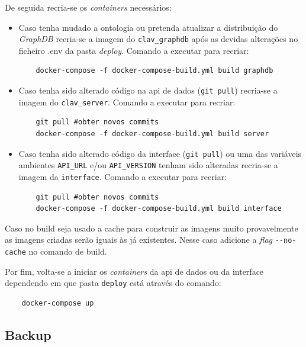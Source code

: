 De seguida recria-se os \textit{containers} necessários:
\begin{itemize}
    \item Caso tenha mudado a ontologia ou pretenda atualizar a distribuição do \textit{GraphDB} recria-se a imagem do \texttt{clav\_graphdb} após as devidas alterações no ficheiro .env da pasta \textit{deploy}. Comando a executar para recriar:
    \begin{verbatim}
    docker-compose -f docker-compose-build.yml build graphdb
    \end{verbatim}
    \item Caso tenha sido alterado código na \acrshort{api} de dados (\verb|git pull|) recria-se a imagem do \texttt{clav\_server}. Comando a executar para recriar:
    \begin{verbatim}
    git pull #obter novos commits
    docker-compose -f docker-compose-build.yml build server
    \end{verbatim}
    \item Caso tenha sido alterado código da interface (\verb|git pull|) ou uma das variáveis ambientes \texttt{API\_URL} e/ou \texttt{API\_VERSION} tenham sido alteradas recria-se a imagem da \texttt{interface}. Comando a executar para recriar:
    \begin{verbatim}
    git pull #obter novos commits
    docker-compose -f docker-compose-build.yml build interface
    \end{verbatim}
\end{itemize}
Caso no build seja usado a cache para construir as imagens muito provavelmente as imagens criadas serão iguais às já existentes. Nesse caso adicione a \textit{flag} \verb|--no-cache| no comando de build.

Por fim, volta-se a iniciar os \textit{containers} da \acrshort{api} de dados ou da interface dependendo em que pasta \texttt{deploy} está através do comando:
\begin{verbatim}
    docker-compose up
\end{verbatim}

\subsection{Backup}\label{sec:inst-backup}

